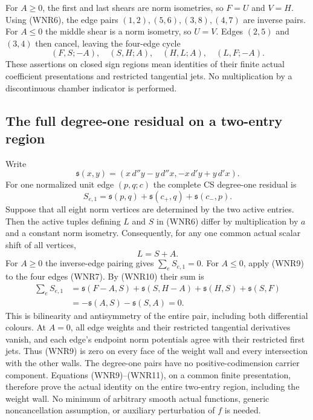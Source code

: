 For $A\ge0$, the first and last shears are norm isometries, so
$F=U$ and $V=H$.  Using (WNR6), the edge pairs
$(1,2),(5,6),(3,8),(4,7)$ are inverse pairs.  For $A\le0$ the
middle shear is a norm isometry, so $U=V$.  Edges $(2,5)$ and
$(3,4)$ then cancel, leaving the four-edge cycle
\[
       (F,S;-A),\quad(S,H;A),\quad(H,L;A),\quad(L,F;-A).
 \tag{WNR7}
\]
These assertions on closed sign regions mean identities of their
finite actual coefficient presentations and restricted tangential
jets.  No multiplication by a discontinuous chamber indicator is
performed.

\subsection{The full degree-one residual on a two-entry region}

Write
\[
 \mathfrak s(x,y)
    =(x\,d''y-y\,d''x,-x\,d'y+y\,d'x).
 \tag{WNR8}
\]
For one normalized unit edge $(p,q;c)$ the complete CS degree-one
residual is
\[
 S_{e,1}=\mathfrak s(p,q)+\mathfrak s(c_+,q)
                              +\mathfrak s(c_-,p).
 \tag{WNR9}
\]
Suppose that all eight norm vertices are determined by the two
active entries.  Then the active tuples defining $L$ and $S$ in
(WNR6) differ by multiplication by $a$ and a constant norm isometry.
Consequently, for any one common actual scalar shift of all vertices,
\[
                              L=S+A.
 \tag{WNR10}
\]
For $A\ge0$ the inverse-edge pairing gives $\sum_eS_{e,1}=0$.
For $A\le0$, apply (WNR9) to the four edges (WNR7).  By (WNR10)
their sum is
\[
 \begin{split}
 \sum_eS_{e,1}
 &=\mathfrak s(F-A,S)+\mathfrak s(S,H-A)
                         +\mathfrak s(H,S)+\mathfrak s(S,F)\\
 &=-\mathfrak s(A,S)-\mathfrak s(S,A)=0.
 \end{split}
 \tag{WNR11}
\]
This is bilinearity and antisymmetry of the entire pair, including
both differential colours.  At $A=0$, all edge weights and their
restricted tangential derivatives vanish, and each edge's endpoint
norm potentials agree with their restricted first jets.  Thus (WNR9)
is zero on every face of the weight wall and every intersection with
the other walls.  The degree-one pairs have no positive-codimension
carrier component.  Equations (WNR9)--(WNR11), on a common finite
presentation, therefore prove the actual identity on the entire
two-entry region, including the weight wall.  No minimum of arbitrary
smooth actual functions, generic noncancellation assumption, or
auxiliary perturbation of $f$ is needed.


